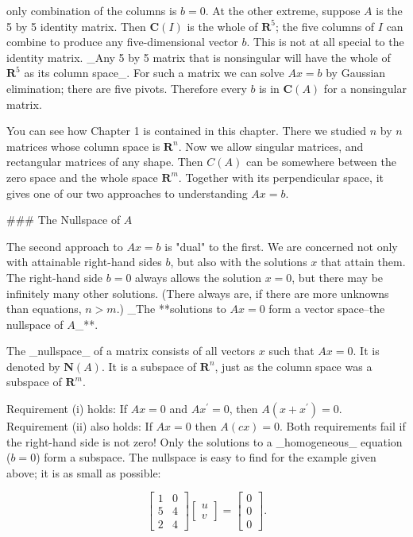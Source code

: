only combination of the columns is \(b=0\). At the other extreme, suppose \(A\) is the 5 by 5 identity matrix. Then \(\bm{C}(I)\) is the whole of \(\mathbf{R}^{5}\); the five columns of \(I\) can combine to produce any five-dimensional vector \(b\). This is not at all special to the identity matrix. _Any 5 by 5 matrix that is nonsingular will have the whole of \(\mathbf{R}^{5}\) as its column space_. For such a matrix we can solve \(Ax=b\) by Gaussian elimination; there are five pivots. Therefore every \(b\) is in \(\bm{C}(A)\) for a nonsingular matrix.

You can see how Chapter 1 is contained in this chapter. There we studied \(n\) by \(n\) matrices whose column space is \(\mathbf{R}^{n}\). Now we allow singular matrices, and rectangular matrices of any shape. Then \(C(A)\) can be somewhere between the zero space and the whole space \(\mathbf{R}^{m}\). Together with its perpendicular space, it gives one of our two approaches to understanding \(Ax=b\).

### The Nullspace of \(A\)

The second approach to \(Ax=b\) is "dual" to the first. We are concerned not only with attainable right-hand sides \(b\), but also with the solutions \(x\) that attain them. The right-hand side \(b=0\) always allows the solution \(x=0\), but there may be infinitely many other solutions. (There always are, if there are more unknowns than equations, \(n>m\).) _The **solutions to \(Ax=0\) form a vector space--the nullspace of \(A\)_**.

The _nullspace_ of a matrix consists of all vectors \(x\) such that \(Ax=0\). It is denoted by \(\bm{N}(A)\). It is a subspace of \(\mathbf{R}^{n}\), just as the column space was a subspace of \(\mathbf{R}^{m}\).

Requirement (i) holds: If \(Ax=0\) and \(Ax^{\prime}=0\), then \(A(x+x^{\prime})=0\). Requirement (ii) also holds: If \(Ax=0\) then \(A(cx)=0\). Both requirements fail if the right-hand side is not zero! Only the solutions to a _homogeneous_ equation (\(b=0\)) form a subspace. The nullspace is easy to find for the example given above; it is as small as possible:

\[\begin{bmatrix}1&0\\ 5&4\\ 2&4\end{bmatrix}\begin{bmatrix}u\\ v\end{bmatrix}=\begin{bmatrix}0\\ 0\\ 0\end{bmatrix}.\]

